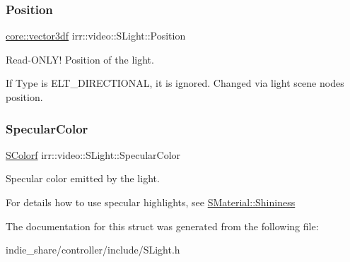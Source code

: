\subsubsection{\texorpdfstring{Position}{Position}}
{\footnotesize\ttfamily \hyperlink{namespaceirr_1_1core_a06f169d08b5c429f5575acb7edbad811}{core\+::vector3df} irr\+::video\+::\+S\+Light\+::\+Position}



Read-\/\+O\+N\+L\+Y! Position of the light. 

If Type is E\+L\+T\+\_\+\+D\+I\+R\+E\+C\+T\+I\+O\+N\+AL, it is ignored. Changed via light scene node\textquotesingle{}s position. \mbox{\label{structirr_1_1video_1_1SLight_a2d66ad28850a8588b2ba727103710604}} 
\subsubsection{\texorpdfstring{Specular\+Color}{SpecularColor}}
{\footnotesize\ttfamily \hyperlink{classirr_1_1video_1_1SColorf}{S\+Colorf} irr\+::video\+::\+S\+Light\+::\+Specular\+Color}



Specular color emitted by the light. 

For details how to use specular highlights, see \hyperlink{classirr_1_1video_1_1SMaterial_a877106a83108db6d1f30a38379d28494}{S\+Material\+::\+Shininess} 

The documentation for this struct was generated from the following file\+:\begin{DoxyCompactItemize}
\item 
indie\+\_\+share/controller/include/S\+Light.\+h\end{DoxyCompactItemize}
